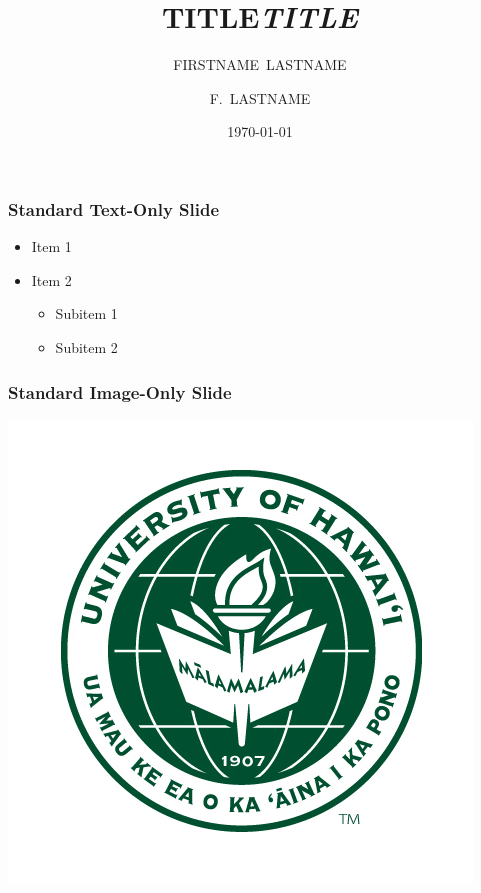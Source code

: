 \documentclass[table]{beamer}
\title{TITLE}
\author{FIRSTNAME~LASTNAME}%
\institute{University of Hawai`i at M\={a}noa}
\date{\today}
\begin{document}
\newcommand{\ibd}{inverse beta decay (IBD)\renewcommand{\ibd}{IBD}}
\newcommand{\nb}{\textcolor{darkgreen}{$\bar{\nu_e}$}}

{
 \begin{frame}
  \titlepage
 \end{frame}
}

\title{\textit{TITLE}}
\author{F.~LASTNAME}




\begin{frame}
  \frametitle{Standard Text-Only Slide}
  \begin{itemize}
    \item Item 1
    \item Item 2
    \begin{itemize}
      \item Subitem 1
      \item Subitem 2
    \end{itemize}
  \end{itemize}
\end{frame}

\begin{frame}
  \frametitle{Standard Image-Only Slide}
  \centering
  \includegraphics[width=0.7\linewidth]{seal.jpg} %
\end{frame}
\end{document}
